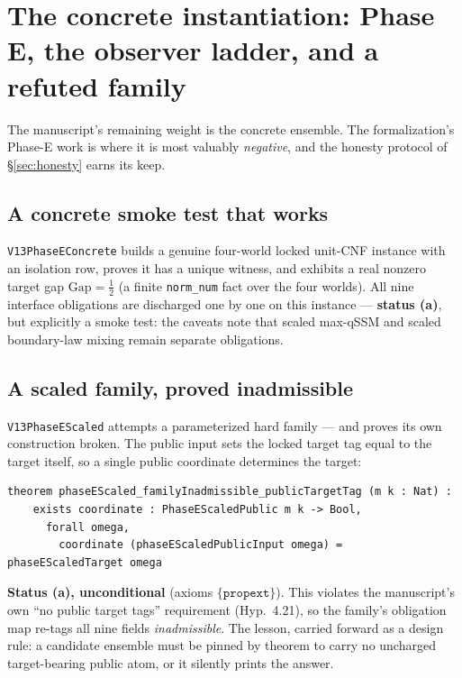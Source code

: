 \documentclass[11pt]{article}
\theoremstyle{definition}
\newcommand{\Gap}{\mathrm{Gap}}
\begin{document}
\section{The concrete instantiation: Phase E, the observer ladder, and a
refuted family}
\label{sec:instantiation}

The manuscript's remaining weight is the concrete ensemble. The formalization's
Phase-E work is where it is most valuably \emph{negative}, and the honesty
protocol of \S\ref{sec:honesty} earns its keep.

\subsection{A concrete smoke test that works}
\texttt{V13PhaseEConcrete} builds a genuine four-world locked unit-CNF instance
with an isolation row, proves it has a unique witness, and exhibits a real nonzero
target gap $\Gap=\tfrac12$ (a finite \texttt{norm\_num} fact over the four
worlds). All nine interface obligations are discharged one by one on this instance
--- \textbf{status (a)}, but explicitly a smoke test: the caveats note that scaled
max-qSSM and scaled boundary-law mixing remain separate obligations.

\subsection{A scaled family, proved inadmissible}
\label{sec:inadmissible}
\texttt{V13PhaseEScaled} attempts a parameterized hard family --- and proves its
own construction broken. The public input sets the locked target tag equal to the
target itself, so a single public coordinate determines the target:
\begin{lstlisting}
theorem phaseEScaled_familyInadmissible_publicTargetTag (m k : Nat) :
    exists coordinate : PhaseEScaledPublic m k -> Bool,
      forall omega,
        coordinate (phaseEScaledPublicInput omega) = phaseEScaledTarget omega
\end{lstlisting}
\textbf{Status (a), unconditional} (axioms $\{\texttt{propext}\}$). This violates
the manuscript's own ``no public target tags'' requirement (Hyp.~4.21), so the
family's obligation map re-tags all nine fields \emph{inadmissible}. The lesson,
carried forward as a design rule: a candidate ensemble must be pinned by theorem to
carry no uncharged target-bearing public atom, or it silently prints the answer.
\end{document}
